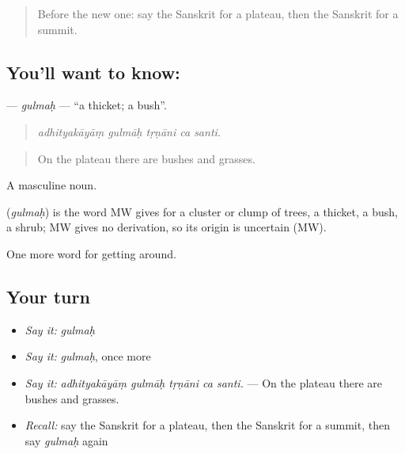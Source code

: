 \label{lesson:SA-C446-gulmah}



\begin{quote}
Before the new one: say the Sanskrit for a plateau, then the Sanskrit for a summit.
\end{quote}

\subsection*{You'll want to know: }
\textbf{} — \emph{gulmaḥ} — \textquotedblleft{}a thicket; a bush\textquotedblright{}.

\begin{quote}
    
\end{quote}

\begin{quote}
\emph{adhityakāyāṃ gulmāḥ tṛṇāni ca santi.}
\end{quote}

\begin{quote}
On the plateau there are bushes and grasses.
\end{quote}

A masculine noun.

\begin{cousinweb}
\textbf{} (\emph{gulmaḥ}) is the word MW gives for a cluster or clump of trees, a thicket, a bush, a shrub; MW gives no derivation, so its origin is uncertain (MW).
\end{cousinweb}

\begin{grammarlens}[title={What you've built}]
One more word for getting around.
\end{grammarlens}

\subsection*{Your turn}
\begin{itemize}
\raggedright
  \item \emph{Say it:} \emph{gulmaḥ}
  \item \emph{Say it:} \emph{gulmaḥ}, once more
  \item \emph{Say it:} \emph{adhityakāyāṃ gulmāḥ tṛṇāni ca santi.} — On the plateau there are bushes and grasses.
  \item \emph{Recall:} say the Sanskrit for a plateau, then the Sanskrit for a summit, then say \emph{gulmaḥ} again
\end{itemize}

